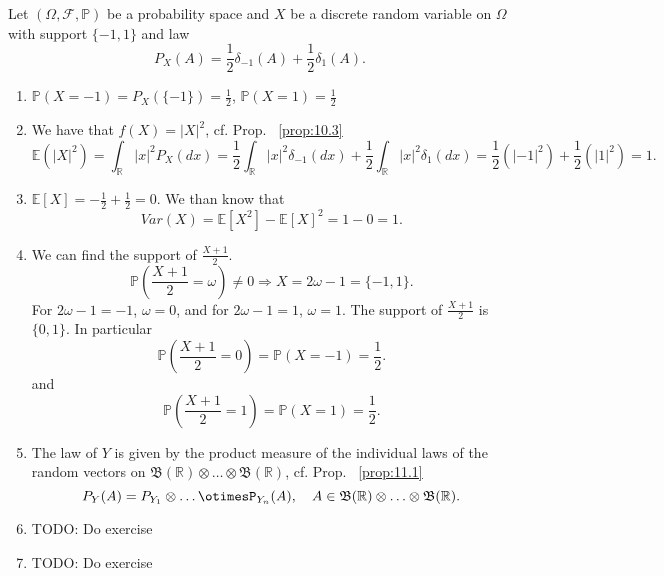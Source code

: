 \begin{exercise}[]
    \label{ex:12.2}
    Let $(\Omega, \mathcal{F}, \mathbb{P})$ be a probability space and $X$ be a discrete random variable on $\Omega$ with 
    support $\{-1,1\} $ and law
    \[
    P_X(A)= \frac{1}{2} \delta_{-1}(A)+\frac{1}{2}\delta_1(A)
    .\] 
    \begin{enumerate}[label=(\alph*)]
        \item
            $\mathbb{P}(X=-1)= P_X(\{-1\} ) = \frac{1}{2}$,
            $\mathbb{P}(X=1) = \frac{1}{2}$
        \item We have that $f(X)=|X|^{2}$, cf. Prop. ~\ref{prop:10.3}
            \[
            \mathbb{E}(|X|^{2}) = \int_{\mathbb{R}}|x|^{2}P_X(dx) 
            = \frac{1}{2} \int_{\mathbb{R}}  \left|x \right|^2 \delta_{-1}(dx) 
            + \frac{1}{2} \int_{\mathbb{R}}  \left|x \right|^2 \delta_{1}(dx)
            = \frac{1}{2}( \left|-1 \right| ^2) + \frac{1}{2}( \left|1 \right| ^2) = 1
            .\] 
        \item $\mathbb{E}[X] = -\frac{1}{2} + \frac{1}{2}= 0$. We than know that
            \[
            Var(X) =\mathbb{E}[X^{2}] - \mathbb{E}[X]^{2} = 1-0=1
            .\] 
        \item
            We can find the support of $\frac{X+1}{2}$.
            \[
                \mathbb{P}\left( \frac{X+1}{2}=\omega \right) \neq 0 \Rightarrow X = 2\omega - 1 = \{-1,1\} 
            .\] 
            For $2\omega-1 = -1$, $\omega=0$, and for  $2\omega-1 = 1$,  $\omega=1$. 
            The support of  $\frac{X+1}{2}$ is $\{0,1\} $.
            In particular
            \[
            \mathbb{P}\left( \frac{X+1}{2} = 0 \right) = \mathbb{P}\left( X=-1 \right) = \frac{1}{2}
            .\] 
            and
            \[
            \mathbb{P}\left( \frac{X+1}{2} = 1 \right) = \mathbb{P}\left( X=1 \right) = \frac{1}{2}
            .\] 
        \item
          The law of $Y $ is given by the product measure of the individual laws of the random vectors
          on $\mathfrak{B}(\mathbb{R}) \otimes \ldots \otimes \mathfrak{B}(\mathbb{R}) $, cf.
          Prop. ~\ref{prop:11.1}
          \[
          P_Y(A) = P_{Y_1}\otimes\ldots\otimesP_{Y_n}(A), \quad A \in 
          \mathfrak{B}(\mathbb{R}) \otimes \ldots \otimes \mathfrak{B}(\mathbb{R}) 
          .\] 
        \item
          TODO: Do exercise
        \item
          TODO: Do exercise
    \end{enumerate}
\end{exercise}

